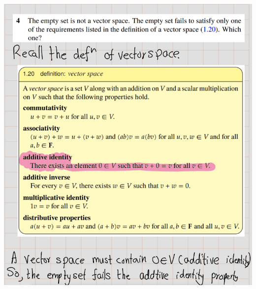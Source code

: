\documentclass[
]{book}
\theoremstyle{definition}
\theoremstyle{definition}
\theoremstyle{definition}
\theoremstyle{definition}
\theoremstyle{remark}
\begin{document}
\includegraphics{fig/Ex1B/Ex4.png}
\end{document}
